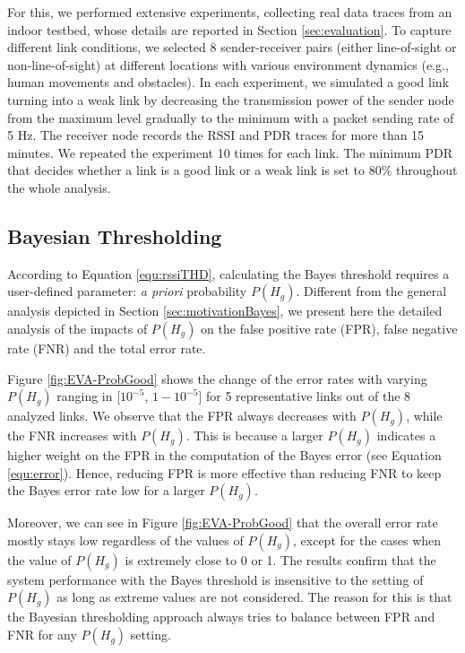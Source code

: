For this, we performed extensive experiments, collecting real data traces from an indoor testbed, whose details are reported in Section \ref{sec:evaluation}. To capture different link conditions, we selected 8 sender-receiver pairs (either line-of-sight or non-line-of-sight) at different locations with various environment dynamics (e.g., human movements and obstacles). In each experiment, we simulated a good link turning into a weak link by decreasing the transmission power of the sender node from the maximum level gradually to the minimum with a packet sending rate of 5 Hz. The receiver node records the RSSI and PDR traces for more than 15 minutes. We repeated the experiment 10 times for each link. The minimum PDR that decides whether a link is a good link or a weak link is set to 80\% throughout the whole analysis.



\subsection{Bayesian Thresholding} \label{sec:ThresholdChoice}

According to Equation \ref{equ:rssiTHD}, calculating the Bayes threshold
requires a user-defined parameter: \textit{a priori} probability $P(H_g)$.
Different from the general analysis depicted in Section \ref{sec:motivationBayes}, we present here the detailed analysis of the impacts of $P(H_g)$ on the false positive rate (FPR), false negative rate (FNR) and the total error rate. 
 
Figure \ref{fig:EVA-ProbGood} shows the change of the error rates with varying $P(H_g)$ ranging in [$10^{-5}$, $1-10^{-5}$] for 5 representative links out of the 8 analyzed links. We observe that the FPR always decreases with $P(H_g)$, while the FNR increases with $P(H_g)$. This is because a larger $P(H_g)$ indicates a higher weight on the FPR in the computation of the Bayes error (see Equation \ref{equ:error}). Hence,  reducing FPR is more effective than reducing FNR to keep the Bayes error rate low for a larger $P(H_g)$.  

Moreover, we can see in Figure \ref{fig:EVA-ProbGood} that the overall error rate mostly stays low regardless of the values of $P(H_g)$, except for the cases when the value of $P(H_g)$ is extremely close to 0 or 1. The results confirm that the system performance with the Bayes threshold is insensitive to the setting of $P(H_g)$ as long as extreme values are not considered. The reason for this is that the Bayesian thresholding approach always tries to balance between FPR and FNR for any $P(H_g)$ setting. 

